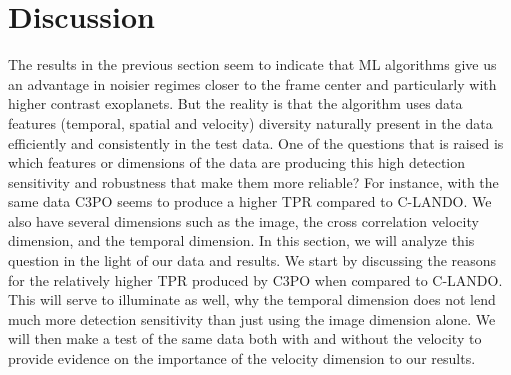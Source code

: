 \documentclass{aa}
\begin{document}

\section{Discussion}
\label{sec:discussion}

The results in the previous section seem to indicate that ML algorithms give us an advantage in noisier regimes closer to the frame center and particularly with higher contrast exoplanets.
But the reality is that the algorithm uses data features (temporal, spatial and velocity) diversity naturally present in the data efficiently and consistently in the test data.
One of the questions that is raised is which features or dimensions of the data are producing this high detection sensitivity and robustness that make them more reliable?
For instance, with the same data C3PO seems to produce a higher TPR compared to C-LANDO.
We also have several dimensions such as the image, the cross correlation velocity dimension, and the temporal dimension.
In this section, we will analyze this question in the light of our data and results.
We start by discussing the reasons for the relatively higher TPR produced by C3PO when compared to C-LANDO.
This will serve to illuminate as well, why the temporal dimension does not lend much more detection sensitivity than just using the image dimension alone.
We will then make a test of the same data both with and without the velocity to provide evidence on the importance of the velocity dimension to our results.
\end{document}
